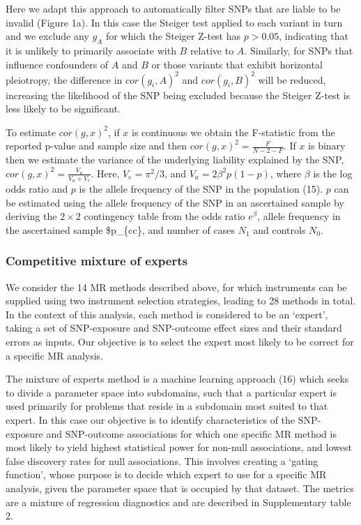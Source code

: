 \documentclass[]{article}
\begin{document}
Here we adapt this approach to automatically filter SNPs that are liable
to be invalid (Figure 1a). In this case the Steiger test applied to each
variant in turn and we exclude any \(g_{A}\) for which the Steiger
Z-test has \(p > 0.05\), indicating that it is unlikely to primarily
associate with \(B\) relative to \(A\). Similarly, for SNPs that
influence confounders of \(A\) and \(B\) or those variants that exhibit
horizontal pleiotropy, the difference in \(cor(g_{i}, A)^2\) and
\(cor(g_{i}, B)^2\) will be reduced, increasing the likelihood of the
SNP being excluded because the Steiger Z-test is less likely to be
significant.

To estimate \(cor(g, x)^2\), if \(x\) is continuous we obtain the
F-statistic from the reported p-value and sample size and then
\(cor(g, x)^2 = \frac{F}{N - 2 - F}\). If \(x\) is binary then we
estimate the variance of the underlying liability explained by the SNP,
\(cor(g, x)^2 = \frac{V_a}{V_a + V_e}\). Here, \(V_e = \pi^2/3\), and
\(V_a = 2\beta^2p(1-p)\), where \(\beta\) is the log odds ratio and
\(p\) is the allele frequency of the SNP in the population (15). \(p\)
can be estimated using the allele frequency of the SNP in an ascertained
sample by deriving the \(2 \times 2\) contingency table from the odds
ratio \(e^\beta\), allele frequency in the ascertained sample
\$p\_\{cc\}, and number of cases \(N_1\) and controls \(N_0\).

\subsubsection{Competitive mixture of
experts}\label{competitive-mixture-of-experts}

We consider the 14 MR methods described above, for which instruments can
be supplied using two instrument selection strategies, leading to 28
methods in total. In the context of this analysis, each method is
considered to be an `expert', taking a set of SNP-exposure and
SNP-outcome effect sizes and their standard errors as inputs. Our
objective is to select the expert most likely to be correct for a
specific MR analysis.

The mixture of experts method is a machine learning approach (16) which
seeks to divide a parameter space into subdomains, such that a
particular expert is used primarily for problems that reside in a
subdomain most suited to that expert. In this case our objective is to
identify characteristics of the SNP-exposure and SNP-outcome
associations for which one specific MR method is most likely to yield
highest statistical power for non-null associations, and lowest false
discovery rates for null associations. This involves creating a `gating
function', whose purpose is to decide which expert to use for a specific
MR analysis, given the parameter space that is occupied by that dataset.
The metrics are a mixture of regression diagnostics and are described in
Supplementary table 2.
\end{document}
